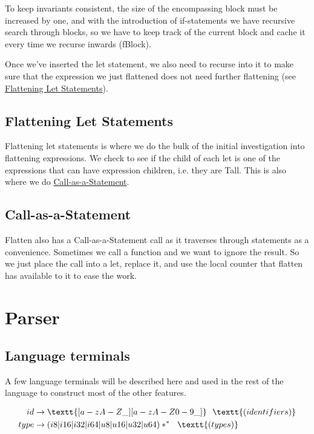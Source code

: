 \documentclass[journal=jacsat, manuscript=article]{achemso}
\begin{document}
To keep invariants consistent, the size of the encompassing block must be increased by one,
and with the introduction of if-statements we have recursive search through blocks, so we
have to keep track of the current block and cache it every time we recurse inwards
(fBlock).

Once we've inserted the let statement, we also need to recurse into it to make sure that
the expression we just flattened does not need further flattening 
(see \hyperref[sec:Flattening Let Statements]{Flattening Let Statements}).

\subsection{Flattening Let Statements}

Flattening let statements is where we do the bulk of the initial investigation into flattening
expressions. We check to see if the child of each let is one of the expressions that can have
expression children, i.e. they are Tall. This is also where we do \hyperref[sec:Call-as-a-Statement]{Call-as-a-Statement}.

\subsection{Call-as-a-Statement}

Flatten also has a Call-as-a-Statement call as it traverses through statements as a
convenience. Sometimes we call a function and we want to ignore the result. So we just
place the call into a let, replace it, and use the local counter that flatten has available to
it to ease the work.

\section{Parser}

\subsection{Language terminals}

A few language terminals will be described here and used in the rest of the
language to construct most of the other features.

\begin{align}
    id &\rightarrow \textt{[a-zA-Z\_][a-zA-Z0-9\_]}\,\,\,\,\textt{(identifiers)}\\
    type &\rightarrow (i8|i16|i32|i64|u8|u16|u32|u64)*^*\,\,\,\,\textt{(types)} \\
\end{align}
\end{document}
